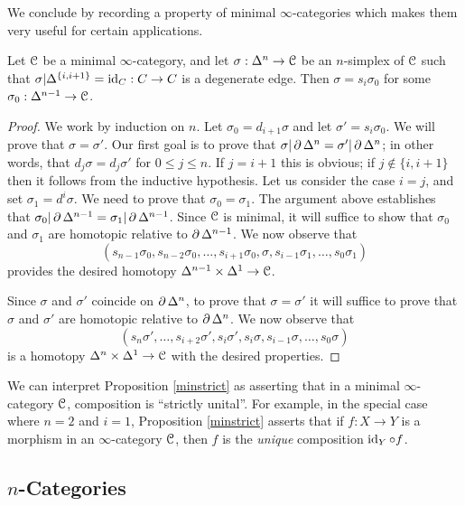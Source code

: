 We conclude by recording a property of minimal $\infty$-categories which makes them very useful for certain applications. 

\begin{proposition}\label{minstrict}
Let $\operatorname{\mathcal{C}}$ be a minimal $\infty$-category, and let $\sigma: \Delta^n \rightarrow \operatorname{\mathcal{C}}$
be an $n$-simplex of $\operatorname{\mathcal{C}}$ such that $\sigma | \Delta^{ \{i, i+1\} } = \operatorname{id}_{C}: C \rightarrow C$
is a degenerate edge. Then $\sigma = s_i \sigma_0$ for some $\sigma_0 : \Delta^{n-1} \rightarrow \operatorname{\mathcal{C}}$.
\end{proposition}

\begin{proof}
We work by induction on $n$. Let $\sigma_0 = d_{i+1} \sigma$ and let $\sigma' = s_i \sigma_0$. 
We will prove that $\sigma = \sigma'$. Our first goal is to prove that $\sigma | \operatorname{\partial} \Delta^n = \sigma' | \operatorname{\partial} \Delta^n$; in other words, that $d_j \sigma = d_j \sigma'$ for $0 \leq j \leq n$.
If $j= i+1$ this is obvious; if
$j \notin \{ i, i+1\}$ then it follows from the inductive hypothesis. Let us consider the case
$i = j$, and set $\sigma_1 = d^i \sigma$. We need to prove that $\sigma_0 = \sigma_1$. The argument above establishes that $\sigma_0 | \operatorname{\partial} \Delta^{n-1} = \sigma_1 | \operatorname{\partial} \Delta^{n-1}$.
Since $\operatorname{\mathcal{C}}$ is minimal, it will suffice to show that $\sigma_0$ and $\sigma_1$ are homotopic relative to $\operatorname{\partial} \Delta^{n-1}$. We now observe that 
$$( s_{n-1} \sigma_0, s_{n-2} \sigma_0, \ldots, s_{i+1} \sigma_0, \sigma, 
s_{i-1} \sigma_1, \ldots, s_0 \sigma_1)$$
provides the desired homotopy $\Delta^{n-1} \times \Delta^1 \rightarrow \operatorname{\mathcal{C}}$.

Since $\sigma$ and $\sigma'$ coincide on $\operatorname{\partial} \Delta^n$, to prove that $\sigma = \sigma'$ it will suffice to prove that $\sigma$ and $\sigma'$ are homotopic relative to $\operatorname{\partial} \Delta^{n}$.
We now observe that
$$ ( s_n \sigma', \ldots, s_{i+2} \sigma', s_{i} \sigma', s_{i} \sigma, s_{i-1} \sigma, \ldots, s_0 \sigma)$$
is a homotopy $\Delta^{n} \times \Delta^1 \rightarrow \operatorname{\mathcal{C}}$ with the desired properties.
\end{proof}

We can interpret Proposition \ref{minstrict} as asserting that in a minimal $\infty$-category
$\operatorname{\mathcal{C}}$, composition is ``strictly unital''. For example, in the special case where $n=2$ and $i=1$, Proposition \ref{minstrict} asserts that if $f: X \rightarrow Y$ is a morphism in an $\infty$-category $\operatorname{\mathcal{C}}$, then $f$ is the {\em unique} composition $\operatorname{id}_{Y} \circ f$.

\subsection{$n$-Categories}\label{ncats}

